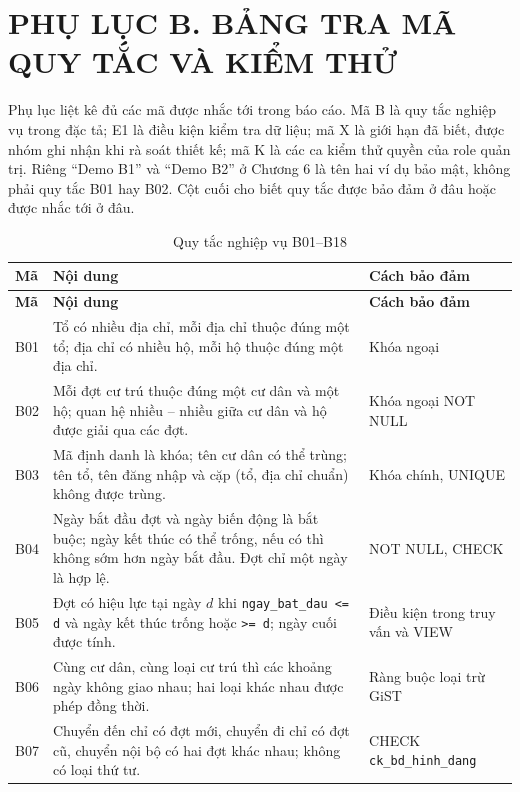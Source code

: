 \section*{PHỤ LỤC B. BẢNG TRA MÃ QUY TẮC VÀ KIỂM THỬ}
\label{sec:phuluc-ma}

Phụ lục liệt kê đủ các mã được nhắc tới trong báo cáo. Mã B là quy tắc nghiệp vụ trong đặc tả; E1 là điều kiện kiểm tra dữ liệu; mã X là giới hạn đã biết, được nhóm ghi nhận khi rà soát thiết kế; mã K là các ca kiểm thử quyền của role quản trị. Riêng ``Demo B1'' và ``Demo B2'' ở Chương 6 là tên hai ví dụ bảo mật, không phải quy tắc B01 hay B02. Cột cuối cho biết quy tắc được bảo đảm ở đâu hoặc được nhắc tới ở đâu.

{\fontsize{11pt}{13pt}\selectfont
\renewcommand{\arraystretch}{1.10}
\begin{longtable}{@{}P{1.15cm}P{8.5cm}P{4.4cm}@{}}
\caption{Quy tắc nghiệp vụ B01--B18}\label{tab:mab}\\
\hline
{}
\textbf{Mã} & \textbf{Nội dung} & \textbf{Cách bảo đảm} \\
\hline
\endfirsthead
\hline
{}
\textbf{Mã} & \textbf{Nội dung} & \textbf{Cách bảo đảm} \\
\hline
\endhead
\hline
\endfoot
B01 & Tổ có nhiều địa chỉ, mỗi địa chỉ thuộc đúng một tổ; địa chỉ có nhiều hộ, mỗi hộ thuộc đúng một địa chỉ. & Khóa ngoại \\
B02 & Mỗi đợt cư trú thuộc đúng một cư dân và một hộ; quan hệ nhiều -- nhiều giữa cư dân và hộ được giải qua các đợt. & Khóa ngoại NOT NULL \\
B03 & Mã định danh là khóa; tên cư dân có thể trùng; tên tổ, tên đăng nhập và cặp (tổ, địa chỉ chuẩn) không được trùng. & Khóa chính, UNIQUE \\
B04 & Ngày bắt đầu đợt và ngày biến động là bắt buộc; ngày kết thúc có thể trống, nếu có thì không sớm hơn ngày bắt đầu. Đợt chỉ một ngày là hợp lệ. & NOT NULL, CHECK \\
B05 & Đợt có hiệu lực tại ngày $d$ khi \texttt{ngay\_bat\_dau <= d} và ngày kết thúc trống hoặc \texttt{>= d}; ngày cuối được tính. & Điều kiện trong truy vấn và VIEW \\
B06 & Cùng cư dân, cùng loại cư trú thì các khoảng ngày không giao nhau; hai loại khác nhau được phép đồng thời. & Ràng buộc loại trừ GiST \\
B07 & Chuyển đến chỉ có đợt mới, chuyển đi chỉ có đợt cũ, chuyển nội bộ có hai đợt khác nhau; không có loại thứ tư. & CHECK \texttt{ck\_bd\_hinh\_dang} \\

\end{longtable}}
